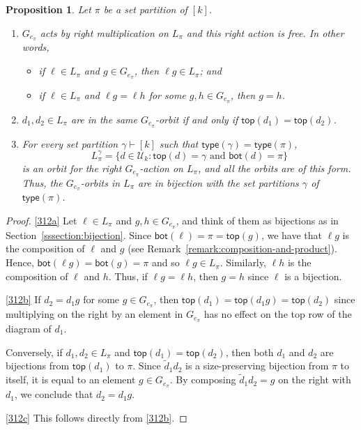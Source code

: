 \documentclass[10pt]{amsart}
\newtheorem{prop}[theorem]{Proposition}
\theoremstyle{definition}
\theoremstyle{remark}
\begin{document}
\begin{prop}\label{prop:orbitreps}
Let $\pi$ be a set partition of $[k]$.
\begin{enumerate}[label=(\alph*)]
    \item\label{312a}
        $G_{e_\pi}$ acts by right multiplication on $L_\pi$
        and this right action is free. In other words,
        \begin{itemize}
            \item
                if $\ell \in L_\pi$ and $g \in G_{e_\pi}$, then $\ell g \in L_\pi$; and
            \item
                if $\ell \in L_\pi$ and $\ell g = \ell h$ for some $g, h \in G_{e_\pi}$, then $g = h$.
        \end{itemize}

    \item \label{312b}
        $d_1, d_2\in L_\pi$ are in the same $G_{e_\pi}$-orbit if and only if $\mathsf{top}(d_1) = \mathsf{top}(d_2)$.

    \item \label{312c}
        For every set partition $\gamma\vdash [k]$ such that $\mathsf{type}(\gamma) = \mathsf{type}(\pi)$,
        $$L_{\pi}^\gamma = \{d \in \mathcal{U}_k : \mathsf{top}(d) = \gamma \text{ and } \mathsf{bot}(d) = \pi\}$$
        is an orbit for the right $G_{e_\pi}$-action on $L_\pi$, and all the orbits are of this form.
        Thus, the $G_{e_\pi}$-orbits in $L_\pi$ are in bijection with the set partitions $\gamma$ of $\mathsf{type}(\pi)$.
\end{enumerate}
\end{prop}

\begin{proof}
   \ref{312a} Let $\ell \in L_\pi$ and $g, h \in G_{e_\pi}$, and think of them as bijections
    as in Section~\ref{sssection:bijection}.
    Since $\mathsf{bot}(\ell) = \pi = \mathsf{top}(g)$,
    we have that $\ell g$ is the composition of $\ell$ and $g$ (see Remark~\ref{remark:composition-and-product}).
    Hence, $\mathsf{bot}(\ell g) = \mathsf{bot}(g) = \pi$ and so $\ell g \in L_\pi$.
    Similarly, $\ell h$ is the composition of $\ell$ and $h$. Thus,
    if $\ell g = \ell h$, then $g = h$ since $\ell$ is a bijection.

    \ref{312b} If $d_2 = d_1 g$ for some $g \in G_{e_\pi}$, then $\mathsf{top}(d_1)
    = \mathsf{top}(d_1 g) = \mathsf{top}(d_2)$ since multiplying on the right
    by an element in $G_{e_\pi}$ has no effect on the top row of the diagram of $d_1$.

    Conversely, if $d_1, d_2 \in L_\pi$ and $\mathsf{top}(d_1)
    = \mathsf{top}(d_2)$, then both $d_1$ and $d_2$ are
    bijections from $\mathsf{top}(d_1)$ to $\pi$.
    Since $\widetilde{d}_1 d_2$ is a size-preserving bijection
    from $\pi$ to itself, it is equal to an element $g \in G_{e_\pi}$.
    By composing $\widetilde{d}_1 d_2 = g$ on the right with $d_1$,
    we conclude that $d_2 = d_1 g$.

    \ref{312c} This follows directly from \ref{312b}.
\end{proof}
\end{document}
